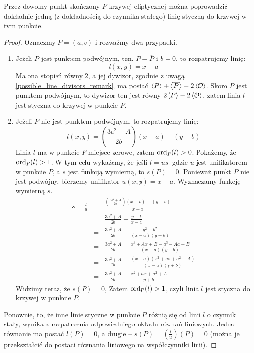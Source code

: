\begin{theorem}\label{line_tangent_at_point_theorem}
Przez dowolny punkt skończony $P$ krzywej eliptycznej
można poprowadzić dokładnie jedną (z dokładnością do czynnika stałego)
linię styczną do krzywej w tym punkcie.
\end{theorem}

\begin{proof}
Oznaczmy $P = (a, b)$ i rozważmy dwa przypadki.
\begin{enumerate}
\item
Jeżeli $P$ jest punktem podwójnym, tzn. $P = \overline{P}$ i $b = 0$,
to rozpatrujemy linię:
\begin{equation}
l(x, y) = x - a
\end{equation}
Ma ona stopień równy $2$,
a jej dywizor, zgodnie z uwagą \ref{possible_line_divisors_remark},
ma postać $\left\langle P\right\rangle + \left\langle\overline{P}\right\rangle - 2\left\langle\mathcal{O}\right\rangle$.
Skoro $P$ jest punktem podwójnym, to dywizor ten jest równy
$2\left\langle P\right\rangle - 2\left\langle\mathcal{O}\right\rangle$,
zatem linia $l$ jest styczna do krzywej w punkcie $P$.
\item
Jeżeli $P$ nie jest punktem podwójnym,
to rozpatrujemy linię:
\begin{equation}
l(x, y) = \left(\frac{3a^2 + A}{2b}\right)(x - a) - (y - b)
\end{equation}
Linia $l$ ma w punkcie $P$ miejsce zerowe, zatem $\operatorname{ord}_P(l) > 0$.
Pokażemy, że $\operatorname{ord}_P(l) > 1$.
W tym celu wykażemy, że jeśli $l = us$,
gdzie $u$ jest unifikatorem w punkcie $P$,
a $s$ jest funkcją wymierną,
to $s(P) = 0$.
Ponieważ punkt $P$ nie jest podwójny,
bierzemy unifikator $u(x, y) = x - a$.
Wyznaczamy funkcję wymierną $s$.
\begin{eqnarray*}
s = \frac{l}{u}
& = & \frac{\left(\frac{3a^2+A}{2b}\right)(x-a) - (y-b)}{x-a} \\
& = & \frac{3a^2+A}{2b} - \frac{y-b}{x-a} \\
& = & \frac{3a^2+A}{2b} - \frac{y^2-b^2}{(x-a)(y+b)} \\
& = & \frac{3a^2+A}{2b} - \frac{x^3+Ax+B - a^3-Aa-B}{(x-a)(y+b)} \\
& = & \frac{3a^2+A}{2b} - \frac{(x-a)(x^2+ax+a^2+A)}{(x-a)(y+b)} \\
& = & \frac{3a^2+A}{2b} - \frac{x^2+ax+a^2+A}{y+b}
\end{eqnarray*}
Widzimy teraz, że $s(P) = 0$,
Zatem $\operatorname{ord}_P(l) > 1$, czyli linia $l$ jest styczna do krzywej w punkcie $P$.
\end{enumerate}
Ponownie, to, że inne linie styczne w punkcie $P$ różnią się od linii $l$
o czynnik stały, wynika z rozpatrzenia odpowiedniego układu równań liniowych.
Jedno równanie ma postać $l(P) = 0$, a drugie --
$s(P) = (\frac{l}{u})(P) = 0$
(można je przekształcić do postaci równania liniowego na współczynniki linii).
\end{proof}

